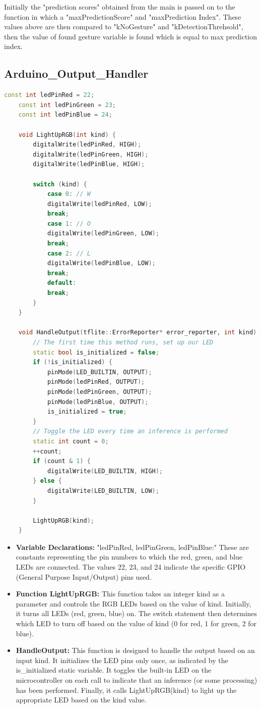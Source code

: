 	Initially the "prediction scores" obtained from the main is passed on to the function in which a "maxPredictionScore" and "maxPrediction Index". These values above are then compared to "kNoGesture" and "kDetectionThrehsold", then the value of found gesture variable is found which is equal to max prediction index. 
	
	\subsection{Arduino\_Output\_Handler}
\begin{lstlisting}[language=C++, caption={LED Control Based on Gesture Recognition}, label={code:led-control}, style=bashstyle]
	const int ledPinRed = 22;
	const int ledPinGreen = 23;
	const int ledPinBlue = 24;
	
	void LightUpRGB(int kind) {
		digitalWrite(ledPinRed, HIGH);
		digitalWrite(ledPinGreen, HIGH);
		digitalWrite(ledPinBlue, HIGH);
		
		switch (kind) {
			case 0: // W
			digitalWrite(ledPinRed, LOW);
			break;
			case 1: // O
			digitalWrite(ledPinGreen, LOW);
			break;
			case 2: // L
			digitalWrite(ledPinBlue, LOW);
			break;
			default:
			break;
		}
	}
	
	void HandleOutput(tflite::ErrorReporter* error_reporter, int kind) {
		// The first time this method runs, set up our LED
		static bool is_initialized = false;
		if (!is_initialized) {
			pinMode(LED_BUILTIN, OUTPUT);
			pinMode(ledPinRed, OUTPUT);
			pinMode(ledPinGreen, OUTPUT);
			pinMode(ledPinBlue, OUTPUT);
			is_initialized = true;
		}
		// Toggle the LED every time an inference is performed
		static int count = 0;
		++count;
		if (count & 1) {
			digitalWrite(LED_BUILTIN, HIGH);
		} else {
			digitalWrite(LED_BUILTIN, LOW);
		}
		
		LightUpRGB(kind);
	}
\end{lstlisting}

		
		\begin{itemize}
			\item \textbf{Variable Declarations:}
			"ledPinRed, ledPinGreen, ledPinBlue:" These are constants representing the pin numbers to which the red, green, and blue LEDs are connected. The values 22, 23, and 24 indicate the specific GPIO (General Purpose Input/Output) pins used.
			\item \textbf{Function LightUpRGB:}
			This function takes an integer kind as a parameter and controls the RGB LEDs based on the value of kind.
			Initially, it turns all LEDs (red, green, blue) on.
			The switch statement then determines which LED to turn off based on the value of kind (0 for red, 1 for green, 2 for blue).
			\item \textbf{HandleOutput:}
			This function is designed to handle the output based on an input kind.
			It initializes the LED pins only once, as indicated by the is\_initialized static variable.
			It toggles the built-in LED on the microcontroller on each call to indicate that an inference (or some processing) has been performed.
			Finally, it calls LightUpRGB(kind) to light up the appropriate LED based on the kind value.
		\end{itemize}
		
